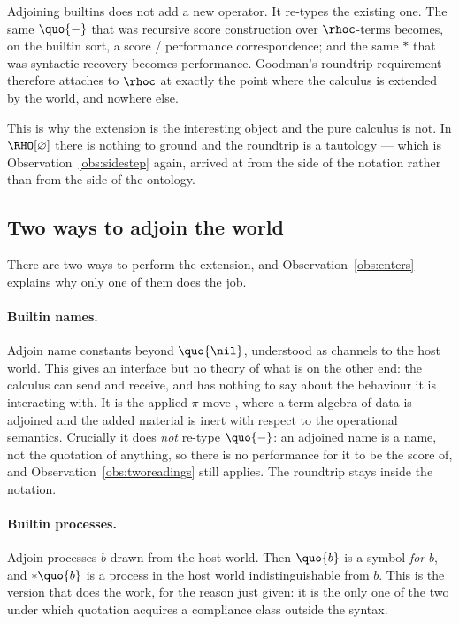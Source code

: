 \begin{observation}
\label{obs:enters}
Adjoining builtins does not add a new operator.
It re-types the existing one.
The same $\quo{-}$ that was recursive score construction over
$\rhoc$-terms becomes, on the builtin sort, a score / performance
correspondence; and the same $*$ that was syntactic recovery
becomes performance.
Goodman's roundtrip requirement therefore attaches to $\rhoc$ at
exactly the point where the calculus is extended by the world, and
nowhere else.
\end{observation}

\noindent
This is why the extension is the interesting object and the pure
calculus is not.
In $\RHO[\varnothing]$ there is nothing to ground and the roundtrip
is a tautology --- which is Observation~\ref{obs:sidestep} again,
arrived at from the side of the notation rather than from the side
of the ontology.

\subsection{Two ways to adjoin the world}
\label{sec:two-ways}

There are two ways to perform the extension, and
Observation~\ref{obs:enters} explains why only one of them does the
job.

\paragraph{Builtin names.}
Adjoin name constants beyond $\quo{\nil}$, understood as channels
to the host world.
This gives an interface but no theory of what is on the other end:
the calculus can send and receive, and has nothing to say about the
behaviour it is interacting with.
It is the applied-$\pi$ move \cite{abadi2001}, where a term algebra
of data is adjoined and the added material is inert with respect to
the operational semantics.
Crucially it does \emph{not} re-type $\quo{-}$: an adjoined name is
a name, not the quotation of anything, so there is no performance
for it to be the score of, and Observation~\ref{obs:tworeadings}
still applies.
The roundtrip stays inside the notation.

\paragraph{Builtin processes.}
Adjoin processes $b$ drawn from the host world.
Then $\quo{b}$ is a symbol \emph{for} $b$, and $*\quo{b}$ is a
process in the host world indistinguishable from $b$.
This is the version that does the work, for the reason just given:
it is the only one of the two under which quotation acquires a
compliance class outside the syntax.

